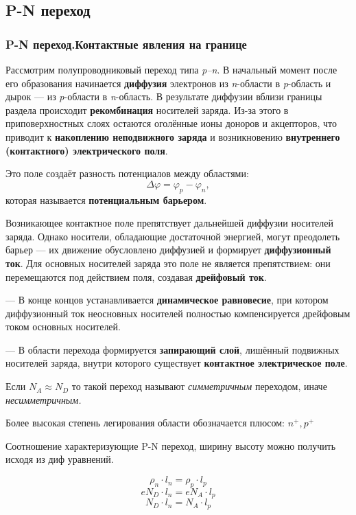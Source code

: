 \documentclass[../main.tex]{subfiles}
\begin{document}
\subsection{P-N переход}

\subsubsection{P-N переход.Контактные явления на границе}


Рассмотрим полупроводниковый переход типа \textit{p–n}. 
В начальный момент после его образования начинается \textbf{диффузия} электронов из \textit{n}-области в \textit{p}-область и дырок — из \textit{p}-области в \textit{n}-область. 
В результате диффузии вблизи границы раздела происходит \textbf{рекомбинация} носителей заряда. 
Из-за этого в приповерхностных слоях остаются оголённые ионы доноров и акцепторов, что приводит к \textbf{накоплению неподвижного заряда} и возникновению \textbf{внутреннего (контактного) электрического поля}.

Это поле создаёт разность потенциалов между областями:
\[
\Delta \varphi = \varphi_p - \varphi_n,
\]
которая называется \textbf{потенциальным барьером}.

Возникающее контактное поле препятствует дальнейшей диффузии носителей заряда. 
Однако носители, обладающие достаточной энергией, могут преодолеть барьер — их движение обусловлено диффузией и формирует \textbf{диффузионный ток}. 
Для основных носителей заряда это поле не является препятствием: они перемещаются под действием поля, создавая \textbf{дрейфовый ток}.

--- В конце концов устанавливается \textbf{динамическое равновесие}, при котором диффузионный ток неосновных носителей полностью компенсируется дрейфовым током основных носителей. 

--- В области перехода формируется \textbf{запирающий слой}, лишённый подвижных носителей заряда, внутри которого существует \textbf{контактное электрическое поле}.


 Если $N_A \approx N_D$ то такой переход называют \textit{симметричным} переходом, иначе \textit{несимметричным.} 

Более высокая степень легирования области обозначается плюсом: $n^{+}, p^{+}$

Соотношение характеризующие P-N переход, ширину высоту можно получить исходя из диф уравнений.

\[\rho_n \cdot l_n = \rho_p \cdot l_p\]
\[e N_D \cdot l_n = e N_A \cdot l_p\]
\[N_D \cdot l_n = N_A \cdot l_p\]
\end{document}
